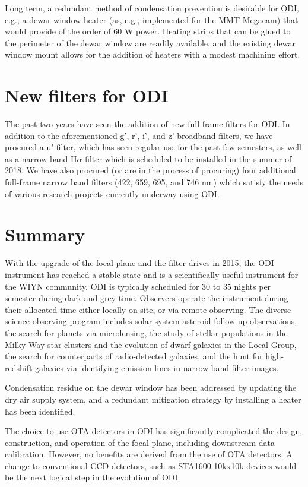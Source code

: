 \documentclass[]{spieman}
\begin{document}
Long term, a redundant method of condensation prevention is desirable for
ODI, e.g., a dewar window heater (as, e.g., implemented for the MMT 
Megacam\cite{McLeod2015}) that would provide of the
order of 60 W power. Heating strips that can be glued to the perimeter of the
dewar window are readily available, and the existing dewar window mount allows
for the addition of heaters with a modest machining effort.

\section{New filters for ODI}

The past two years have seen the addition of new full-frame filters for ODI.  In
addition to the aforementioned g', r', i', and z' broadband filters, we have
procured a u' filter, which has seen regular use for the past few semesters, as
well as a narrow band H$\alpha$ filter which is scheduled to be installed in the
summer of 2018. We have also procured (or are in the process of procuring) four
additional full-frame narrow band filters (422, 659, 695, and 746 nm) which
satisfy the needs of various research projects currently underway using ODI.

\section{Summary}

With the upgrade of the focal plane and the filter drives in 2015, the ODI
instrument has reached a stable state and is a scientifically useful instrument
for the WIYN community\cite{janesh2015, adams2015a, adams2015b, cannon2015, davis2015,
janowiecki2015, janowiecki2015PhDT, janesh2017, jewitt2017, leisman2017, rhode2017, 
lee2018a, lee2018b, lee2018c,   gorsuch2018 }. ODI is typically scheduled for 30 to 35 nights per
semester during dark and grey time. Observers operate the instrument during
their allocated time either locally on site, or via remote observing. The
diverse science observing program includes solar system asteroid follow up
observations, the search for planets via microlensing, the study of stellar
populations in the  Milky Way star clusters and the evolution of dwarf galaxies
in the Local Group, the search for  counterparts of radio-detected galaxies, and
the hunt for high-redshift galaxies via identifying emission lines in narrow
band filter images.

Condensation residue on the dewar window has been addressed by updating the dry
air supply system, and a redundant  mitigation strategy by installing a heater
has been identified.

The choice to use  OTA detectors in ODI has significantly complicated the
design, construction, and operation of the focal plane, including downstream
data calibration. However, no benefits are derived from the use of OTA
detectors.  A change to conventional CCD detectors, such as STA1600 10kx10k
devices would be the next logical step in the evolution of ODI.



 

\end{document}
